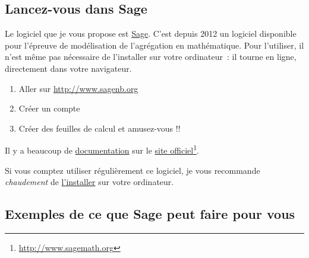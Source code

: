 \subsection{Lancez-vous dans Sage}

Le logiciel que je vous propose est \href{http://www.sagemath.org}{Sage}. C'est depuis 2012 un logiciel disponible pour l'épreuve de modélisation de l'agrégation en mathématique. Pour l'utiliser, il n'est même pas nécessaire de l'installer sur votre ordinateur~: il tourne en ligne, directement dans votre navigateur.

\begin{enumerate}

	\item
		Aller sur \href{http://www.sagenb.org}{http://www.sagenb.org}
	\item
		Créer un compte
	\item
		Créer des feuilles de calcul et amusez-vous !!

\end{enumerate}

Il y a beaucoup de \href{http://lmgtfy.com/?q=sage+documentation}{documentation} sur le \href{http://www.sagemath.org}{site officiel}\footnote{\href{http://www.sagemath.org}{http://www.sagemath.org}}.

Si vous comptez utiliser régulièrement ce logiciel, je vous recommande \emph{chaudement} de \href{http://mirror.switch.ch/mirror/sagemath/index.html}{l'installer} sur votre ordinateur.

\subsection{Exemples de ce que Sage peut faire pour vous}

